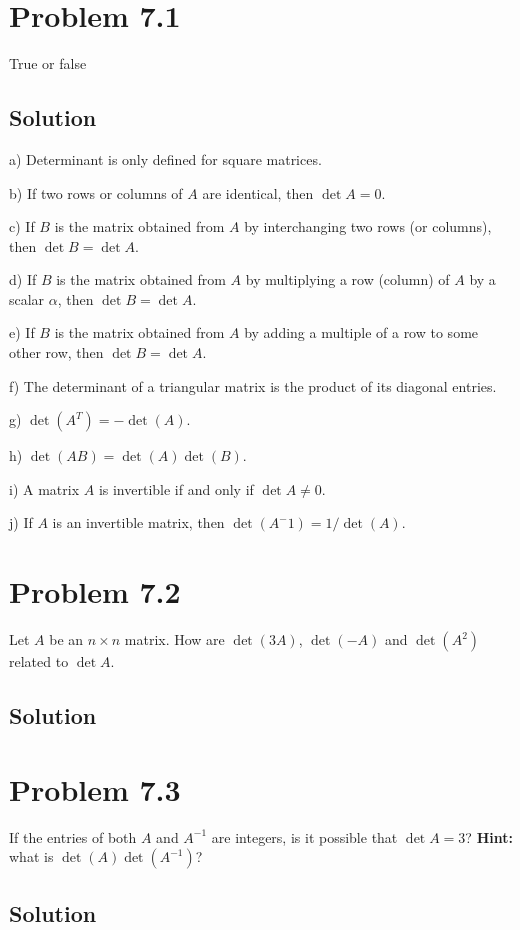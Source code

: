 \documentclass{article}
\begin{document}
\section*{Problem 7.1}
True or false

\subsection*{Solution}
a) Determinant is only defined for square matrices.

b) If two rows or columns of $A$ are identical, then $\det A=0$.

c) If $B$ is the matrix obtained from $A$ by interchanging two rows (or columns), then $\det B=\det A$.

d) If $B$ is the matrix obtained from $A$ by multiplying a row (column) of $A$ by a scalar $\alpha$, then $\det B=\det A$.

e) If $B$ is the matrix obtained from $A$ by adding a multiple of a row to some other row, then $\det B=\det A$.

f) The determinant of a triangular matrix is the product of its diagonal entries.

g) $\det(A^T)=-\det(A)$.

h) $\det(AB)=\det(A)\det(B)$.

i) A matrix $A$ is invertible if and only if $\det A\neq 0$.

j) If $A$ is an invertible matrix, then $\det(A^-1)=1/\det(A)$.

\section*{Problem 7.2}
Let $A$ be an $n\times n$ matrix. How are $\det(3A)$, $\det(-A)$ and $\det(A^2)$ related to $\det A$.

\subsection*{Solution}

\section*{Problem 7.3}
If the entries of both $A$ and $A^{-1}$ are integers, is it possible that $\det A=3$? \textbf{Hint:} what is $\det(A)\det(A^{-1})$?

\subsection*{Solution}
\end{document}
